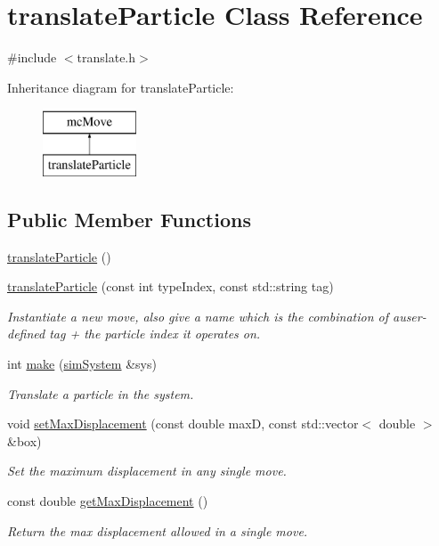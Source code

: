 \hypertarget{classtranslate_particle}{\section{translate\-Particle Class Reference}
\label{classtranslate_particle}
}


{\ttfamily \#include $<$translate.\-h$>$}

Inheritance diagram for translate\-Particle\-:\begin{figure}[H]
\begin{center}
\leavevmode
\includegraphics[height=2.000000cm]{classtranslate_particle}
\end{center}
\end{figure}
\subsection*{Public Member Functions}
\begin{DoxyCompactItemize}
\item 
\hyperlink{classtranslate_particle_ac16b682a2119d7ebd6c7df75fa224ab4}{translate\-Particle} ()
\item 
\hyperlink{classtranslate_particle_aa9ffcde3ec4cbd82e939c7cb9ee85094}{translate\-Particle} (const int type\-Index, const std\-::string tag)
\begin{DoxyCompactList}\small\item\em Instantiate a new move, also give a name which is the combination of auser-\/defined tag + the particle index it operates on. \end{DoxyCompactList}\item 
int \hyperlink{classtranslate_particle_a7ec5c9259f1aae3f7aefdb4db3ee5468}{make} (\hyperlink{classsim_system}{sim\-System} \&sys)
\begin{DoxyCompactList}\small\item\em Translate a particle in the system. \end{DoxyCompactList}\item 
void \hyperlink{classtranslate_particle_a65beec2511e79198e6241ad2bc18b02c}{set\-Max\-Displacement} (const double max\-D, const std\-::vector$<$ double $>$ \&box)
\begin{DoxyCompactList}\small\item\em Set the maximum displacement in any single move. \end{DoxyCompactList}\item 
const double \hyperlink{classtranslate_particle_a5f1e76a0e8f20978b1c1069f698f89e6}{get\-Max\-Displacement} ()
\begin{DoxyCompactList}\small\item\em Return the max displacement allowed in a single move. \end{DoxyCompactList}\end{DoxyCompactItemize}
